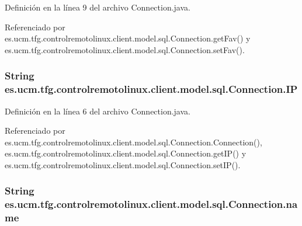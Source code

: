 Definición en la línea 9 del archivo Connection.\-java.



Referenciado por es.\-ucm.\-tfg.\-controlremotolinux.\-client.\-model.\-sql.\-Connection.\-get\-Fav() y es.\-ucm.\-tfg.\-controlremotolinux.\-client.\-model.\-sql.\-Connection.\-set\-Fav().

\hypertarget{classes_1_1ucm_1_1tfg_1_1controlremotolinux_1_1client_1_1model_1_1sql_1_1Connection_acbd1f3f267574d1ec6d4a657c0f4fc59}{
\subsubsection[{I\-P}]{\setlength{\rightskip}{0pt plus 5cm}String es.\-ucm.\-tfg.\-controlremotolinux.\-client.\-model.\-sql.\-Connection.\-I\-P\hspace{0.3cm}{\ttfamily [private]}}}\label{classes_1_1ucm_1_1tfg_1_1controlremotolinux_1_1client_1_1model_1_1sql_1_1Connection_acbd1f3f267574d1ec6d4a657c0f4fc59}


Definición en la línea 6 del archivo Connection.\-java.



Referenciado por es.\-ucm.\-tfg.\-controlremotolinux.\-client.\-model.\-sql.\-Connection.\-Connection(), es.\-ucm.\-tfg.\-controlremotolinux.\-client.\-model.\-sql.\-Connection.\-get\-I\-P() y es.\-ucm.\-tfg.\-controlremotolinux.\-client.\-model.\-sql.\-Connection.\-set\-I\-P().

\hypertarget{classes_1_1ucm_1_1tfg_1_1controlremotolinux_1_1client_1_1model_1_1sql_1_1Connection_a08e64027f2b9152da0f574100143b061}{
\subsubsection[{name}]{\setlength{\rightskip}{0pt plus 5cm}String es.\-ucm.\-tfg.\-controlremotolinux.\-client.\-model.\-sql.\-Connection.\-name\hspace{0.3cm}{\ttfamily [private]}}}\label{classes_1_1ucm_1_1tfg_1_1controlremotolinux_1_1client_1_1model_1_1sql_1_1Connection_a08e64027f2b9152da0f574100143b061}


